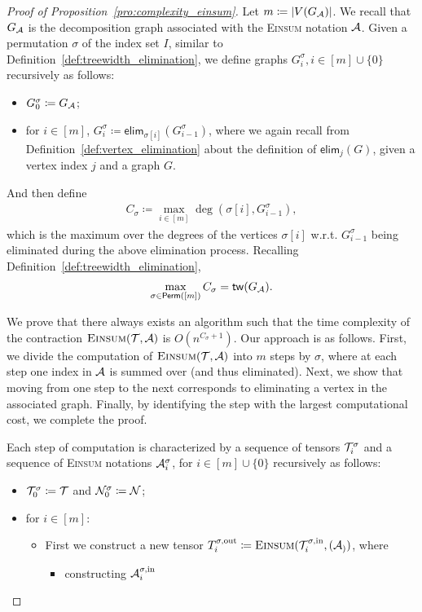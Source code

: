 \documentclass[letterpaper,11pt]{article}
\def\Einsum{\textsc{Einsum}}
\newcommand{\perm}[1]{\mathsf{Perm}(#1)}
\newcommand{\tensorcontraction}{\textsc{Einsum}}
\newcommand{\degp}[2]{\deg(#1,#2)}
\newcommand{\verticesp}[1]{V(#1)}
\newcommand{\treewidthp}[1]{\mathsf{tw}(#1)}
\newcommand{\less}{O}
\newcommand{\eliminatevg}[2]{\mathsf{elim}_{#1}(#2)}
\begin{document}
\begin{bibunit}[plainnat]
\iffalse
\begin{proof}[Proof of Proposition~\ref{pro:complexity_einsum}]
Let $m \coloneqq |\verticesp{G_\calA}|$. We recall that $G_{{\mathcal{A}}}$ is the decomposition graph associated with the \Einsum{} notation ${\mathcal{A}}$. Given a permutation $\sigma$ of the index set $I$, similar to Definition~\ref{def:treewidth_elimination}, we define graphs $G^\sigma_i, i \in [m] \cup \{0\}$ recursively as follows: 
\begin{itemize}
\item $G^\sigma_0 \coloneqq G_{\mathcal{A}}$;
\item for $i \in [m]$, $G^\sigma_i \coloneqq \eliminatevg{\sigma[i]}{G^\sigma_{i-1}}$,  
where we again recall from Definition~\ref{def:vertex_elimination} about the definition of $\eliminatevg{j}{G}$, given a vertex index $j$ and a graph $G$.
\end{itemize}
And then define
\begin{align*}
C_\sigma \coloneqq \max_{i\in[m]}\degp{\sigma[i]}{G^\sigma_{i-1}},
\end{align*}
which is the maximum over the degrees of the vertices $\sigma[i]$ w.r.t. $G_{i - 1}^{\sigma}$ being eliminated during the above elimination process. Recalling Definition~\ref{def:treewidth_elimination}, 
\begin{align*}
    \max_{\sigma \in \perm{[m]}}C_\sigma = \treewidthp{G_\calA}. 
\end{align*}

We prove that there always exists an algorithm such that the time complexity of the contraction $\tensorcontraction(\calT, \calA)$ is $\less(n^{C_\sigma + 1})$. Our approach is as follows. First, we divide the computation of $\tensorcontraction(\calT,\calA)$ into $m$ steps by $\sigma$, where at each step one index in ${\mathcal{A}}$ is summed over (and thus eliminated). Next, we show that moving from one step to the next corresponds to eliminating a vertex in the associated graph. Finally, by identifying the step with the largest computational cost, we complete the proof.

Each step of computation is characterized by a sequence of tensors ${\mathcal{T}}^\sigma_i$ and a sequence of \Einsum{} notations $ {\mathcal{A}}^\sigma_i$, for $i \in [m] \cup \{0\}$ recursively as follows:
\begin{itemize}
\item ${\mathcal{T}}^\sigma_0 \coloneqq {\mathcal{T}}$ and ${\mathcal{N}}^\sigma_0 \coloneqq {\mathcal{N}}$;

\item for $i \in [m]$:
\begin{itemize}
    \item First we construct a new tensor $T_{i}^{\sigma,\mathrm{out}} \coloneqq \tensorcontraction(\calT_i^{\sigma,\mathrm{in}}, (\calA_))$, where
    \begin{itemize}
        \item constructing ${\mathcal{A}}^{\sigma, \mathrm{in}}_i$ 
    \end{itemize}
\end{itemize}
\end{itemize}



\end{proof}
\end{bibunit}
\end{document}
